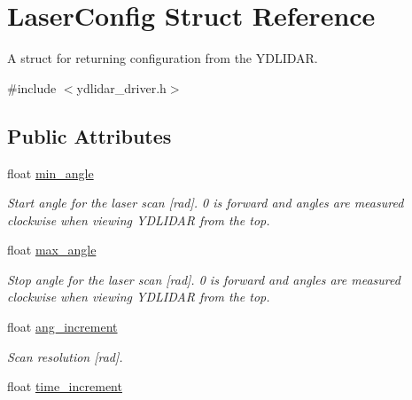 \hypertarget{struct_laser_config}{}\section{Laser\+Config Struct Reference}
\label{struct_laser_config}


A struct for returning configuration from the Y\+D\+L\+I\+D\+AR.  




{\ttfamily \#include $<$ydlidar\+\_\+driver.\+h$>$}

\subsection*{Public Attributes}
\begin{DoxyCompactItemize}
\item 
float \hyperlink{struct_laser_config_a0b68f6041dc05310626ef221d4cc2db9}{min\+\_\+angle}\hypertarget{struct_laser_config_a0b68f6041dc05310626ef221d4cc2db9}{}\label{struct_laser_config_a0b68f6041dc05310626ef221d4cc2db9}

\begin{DoxyCompactList}\small\item\em Start angle for the laser scan \mbox{[}rad\mbox{]}. 0 is forward and angles are measured clockwise when viewing Y\+D\+L\+I\+D\+AR from the top. \end{DoxyCompactList}\item 
float \hyperlink{struct_laser_config_a2d09a717415770110787788127ad6b14}{max\+\_\+angle}\hypertarget{struct_laser_config_a2d09a717415770110787788127ad6b14}{}\label{struct_laser_config_a2d09a717415770110787788127ad6b14}

\begin{DoxyCompactList}\small\item\em Stop angle for the laser scan \mbox{[}rad\mbox{]}. 0 is forward and angles are measured clockwise when viewing Y\+D\+L\+I\+D\+AR from the top. \end{DoxyCompactList}\item 
float \hyperlink{struct_laser_config_a67279ae0f648a129521576f52c321932}{ang\+\_\+increment}\hypertarget{struct_laser_config_a67279ae0f648a129521576f52c321932}{}\label{struct_laser_config_a67279ae0f648a129521576f52c321932}

\begin{DoxyCompactList}\small\item\em Scan resolution \mbox{[}rad\mbox{]}. \end{DoxyCompactList}\item 
float \hyperlink{struct_laser_config_ada1a720957176549489916335edcc335}{time\+\_\+increment}\hypertarget{struct_laser_config_ada1a720957176549489916335edcc335}{}\label{struct_laser_config_ada1a720957176549489916335edcc335}


\end{DoxyCompactItemize}
